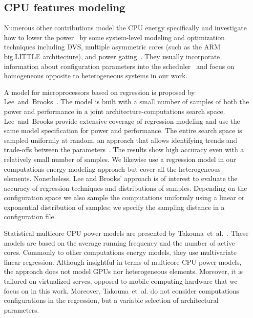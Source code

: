 \subsection{CPU features modeling}
\label{sec:soa-cpu}

Numerous other contributions model the CPU energy specifically and investigate how to lower the power~\citep{hong1999power, luo2001battery, chowdhury2005static} by some system-level modeling and optimization techniques including DVS, multiple asymmetric cores (such as the ARM big.LITTLE architecture), and power gating~\citep{walker2017accurate}. They usually incorporate information about configuration parameters into the scheduler~\citep{seewald2019coarse} and focus on homogeneous opposite to heterogeneous systems in our work. 

A model for microprocessors based on regression is proposed by Lee~and~Brooks~\citep{lee2006statistically,lee2006accurate}. The model is built with a small number of samples of both the power and performance in a joint architecture-computations search space. Lee~and~Brooks provide extensive coverage of regression modeling and use the same model specification for power and performance. The entire search space is sampled uniformly at random, an approach that allows identifying trends and trade-offs between the parameters~\citep{lee2006accurate}. The results show high accuracy even with a relatively small number of samples. We likewise use a regression model in our computations energy modeling approach but cover all the heterogeneous elements. Nonetheless, Lee and Brooks' approach is of interest to evaluate the accuracy of regression techniques and distributions of samples. Depending on the configuration space we also sample the computations uniformly using a linear or exponential distribution of samples: we specify the sampling distance in a configuration file. 

Statistical multicore CPU power models are presented by Takouna~et~al.~\citep{takouna2011accurate}. These models are based on the average running frequency and the number of active cores. Commonly to other computations energy models, they use multivariate linear regression. Although insightful in terms of multicore CPU power models, the approach does not model GPUs nor heterogeneous elements. Moreover, it is tailored on virtualized serves, opposed to mobile computing hardware that we focus on in this work. Moreover, Takouna~et~al. do not consider computations configurations in the regression, but a variable selection of architectural parameters. 

